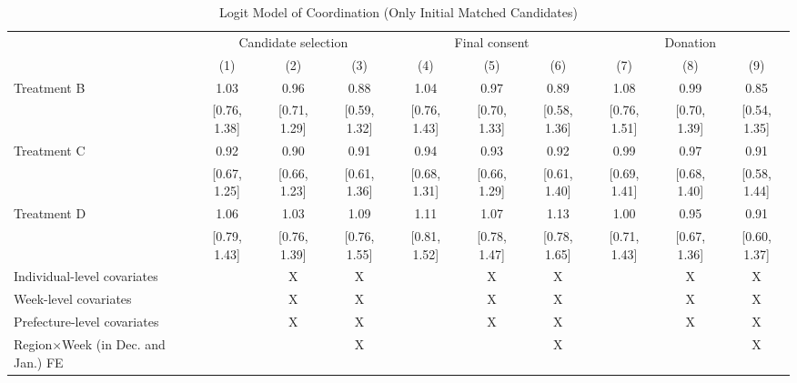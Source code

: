 \documentclass[12pt, a4paper]{article}
\begin{document}
\begin{landscape}\begin{table}[H]

\caption{\label{tab:logit-coordinate-initial-matched}Logit Model of Coordination (Only Initial Matched Candidates)}
\centering
\fontsize{8}{10}\selectfont
\begin{threeparttable}
\begin{tabular}[t]{lccccccccc}
\toprule
\multicolumn{1}{c}{ } & \multicolumn{3}{c}{Candidate selection} & \multicolumn{3}{c}{Final consent} & \multicolumn{3}{c}{Donation} \\
\cmidrule(l{3pt}r{3pt}){2-4} \cmidrule(l{3pt}r{3pt}){5-7} \cmidrule(l{3pt}r{3pt}){8-10}
  & (1) & (2) & (3) & (4) & (5) & (6) & (7) & (8) & (9)\\
\midrule
Treatment B & \num{1.03} & \num{0.96} & \num{0.88} & \num{1.04} & \num{0.97} & \num{0.89} & \num{1.08} & \num{0.99} & \num{0.85}\\
 & {}[\num{0.76}, \num{1.38}] & {}[\num{0.71}, \num{1.29}] & {}[\num{0.59}, \num{1.32}] & {}[\num{0.76}, \num{1.43}] & {}[\num{0.70}, \num{1.33}] & {}[\num{0.58}, \num{1.36}] & {}[\num{0.76}, \num{1.51}] & {}[\num{0.70}, \num{1.39}] & {}[\num{0.54}, \num{1.35}]\\
Treatment C & \num{0.92} & \num{0.90} & \num{0.91} & \num{0.94} & \num{0.93} & \num{0.92} & \num{0.99} & \num{0.97} & \num{0.91}\\
 & {}[\num{0.67}, \num{1.25}] & {}[\num{0.66}, \num{1.23}] & {}[\num{0.61}, \num{1.36}] & {}[\num{0.68}, \num{1.31}] & {}[\num{0.66}, \num{1.29}] & {}[\num{0.61}, \num{1.40}] & {}[\num{0.69}, \num{1.41}] & {}[\num{0.68}, \num{1.40}] & {}[\num{0.58}, \num{1.44}]\\
Treatment D & \num{1.06} & \num{1.03} & \num{1.09} & \num{1.11} & \num{1.07} & \num{1.13} & \num{1.00} & \num{0.95} & \num{0.91}\\
 & {}[\num{0.79}, \num{1.43}] & {}[\num{0.76}, \num{1.39}] & {}[\num{0.76}, \num{1.55}] & {}[\num{0.81}, \num{1.52}] & {}[\num{0.78}, \num{1.47}] & {}[\num{0.78}, \num{1.65}] & {}[\num{0.71}, \num{1.43}] & {}[\num{0.67}, \num{1.36}] & {}[\num{0.60}, \num{1.37}]\\
\midrule
Individual-level covariates &  & X & X &  & X & X &  & X & X\\
Week-level covariates &  & X & X &  & X & X &  & X & X\\
Prefecture-level covariates &  & X & X &  & X & X &  & X & X\\
Region$\times$Week (in Dec. and Jan.) FE &  &  & X &  &  & X &  &  & X\\

\end{tabular}
\end{threeparttable}
\end{table}
\end{landscape}
\end{document}
